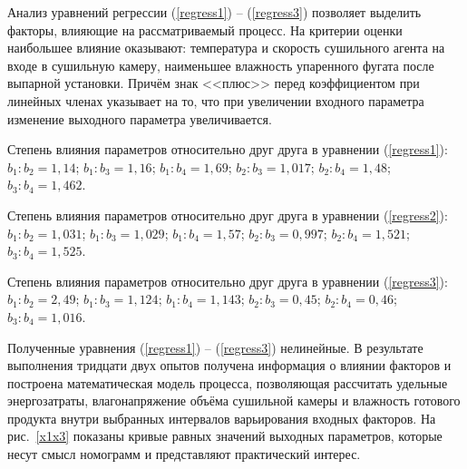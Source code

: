 Анализ уравнений регрессии (\ref{regress1}) -- (\ref{regress3}) позволяет
выделить факторы, влияющие на рассматриваемый процесс. На критерии оценки наибольшее влияние
оказывают: температура и скорость сушильного агента
на входе в сушильную камеру, наименьшее влажность упаренного фугата после
выпарной установки.
 Причём  знак <<плюс>> перед коэффициентом при линейных членах указывает на то, что при
 увеличении входного параметра изменение  выходного параметра увеличивается.

Степень влияния параметров относительно друг друга в уравнении (\ref{regress1}):
$b_{1}:b_{2}=1,14$; $b_{1}:b_{3}=1,16$; $b_{1}:b_{4}=1,69$; $b_{2}:b_{3}=1,017$;
$b_{2}:b_{4}=1,48$; $b_{3}:b_{4}=1,462$.

Степень влияния параметров относительно друг друга в уравнении (\ref{regress2}):
$b_{1}:b_{2}=1,031$; $b_{1}:b_{3}=1,029$; $b_{1}:b_{4}=1,57$; $b_{2}:b_{3}=0,997$;
$b_{2}:b_{4}=1,521$; $b_{3}:b_{4}=1,525$.

Степень влияния параметров относительно друг друга в уравнении (\ref{regress3}):
$b_{1}:b_{2}=2,49$; $b_{1}:b_{3}=1,124$; $b_{1}:b_{4}=1,143$; $b_{2}:b_{3}=0,45$;
$b_{2}:b_{4}=0,46$; $b_{3}:b_{4}=1,016$.

Полученные уравнения (\ref{regress1}) -- (\ref{regress3}) нелинейные.
В результате выполнения тридцати двух опытов получена информация о влиянии факторов и
построена математическая модель процесса, позволяющая рассчитать удельные энергозатраты,
влагонапряжение объёма сушильной камеры и влажность готового продукта
 внутри выбранных интервалов варьирования входных факторов.
На рис.~\ref{x1x3} показаны кривые равных значений выходных
параметров, которые несут смысл номограмм и представляют
практический интерес.


%
